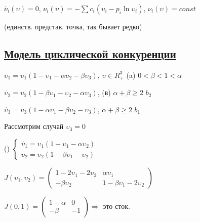 \documentclass{article}
\begin{document}
\vspace{0.5cm}
\(\dot{\nu_i}(\upsilon) = 0\), \hspace{10pt}\({\nu_i}(\upsilon) = -\sum c_i(\upsilon_i - p_i\ln \upsilon_i)\), \hspace{10pt} \({\nu_i}(\upsilon) = const\)

(единств. представ. точка, так бывает редко)

\vspace{0.5cm}
\subsection*{{\Large \underline{Модель циклической конкуренции}}}

\vspace{0.5cm}
\(\dot{\upsilon_1} = \upsilon_1(1-\upsilon_1 - \alpha\upsilon_2 - \beta\upsilon_3) \), \hspace{3cm}\( \upsilon \in R_+^3\) \hspace{2cm} (a) \(0 < \beta < 1 < \alpha\)

\(\dot{\upsilon_2} = \upsilon_2(1-\beta\upsilon_1 - \upsilon_2 - \alpha\upsilon_3) \), \hspace{6.3cm} (в) \(\alpha+\beta\geq 2\) \(b_2\)

\(\dot{\upsilon_3} = \upsilon_3(1-\alpha\upsilon_1 - \beta\upsilon_2 - \upsilon_3) \),
\hspace{6.6cm} \(\alpha+\beta\geq 2\) \(b_1\)

\vspace{0.5cm}
Рассмотрим случай { \underline{\(\upsilon_3 = 0\)}}

\vspace{0.5cm}
({})
\(
 \begin{cases}
    \dot{\upsilon_1} = \upsilon_1(1-\upsilon_1 - \alpha\upsilon_2 ) 
    \\
    \dot{\upsilon_2} = \upsilon_2(1-\beta\upsilon_1 - \upsilon_2 ) 
 \end{cases}
\)

\vspace{0.5cm}
\(
J(\upsilon_1,\upsilon_2) = 
 \begin{pmatrix}
 1-2\upsilon_1-2\upsilon_2 & \alpha\upsilon_1\\
 -\beta\upsilon_2 & 1-\beta\upsilon_1 - 2\upsilon_2
 \end{pmatrix}
\)

\vspace{0.5cm}

\(
 J(0,1) = 
 \begin{pmatrix}
 1-\alpha & 0 \\ 
 -\beta & -1
 \end{pmatrix}
\)\hspace{0.5cm}\(\Rightarrow\) это сток.
\end{document}
